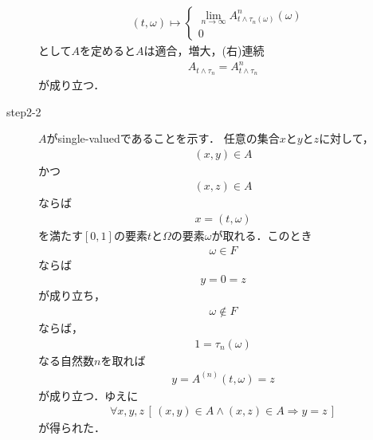 \begin{sketch}
\begin{description}
				
				
				\begin{align}
					(t,\omega) \longmapsto
					\begin{cases}
						\lim_{n \to \infty} A^n_{t \wedge \tau_n(\omega)}(\omega) & \\
						0
					\end{cases}
				\end{align}
				として$A$を定めると$A$は適合，増大，(右)連続
				\begin{align}
					A_{t \wedge \tau_n} = A^n_{t \wedge \tau_n}
				\end{align}
				が成り立つ．
				
			\item[step2-2]
				$A$がsingle-valuedであることを示す．
				任意の集合$x$と$y$と$z$に対して，
				\begin{align}
					(x,y) \in A
				\end{align}
				かつ
				\begin{align}
					(x,z) \in A
				\end{align}
				ならば
				\begin{align}
					x = (t,\omega)
				\end{align}
				を満たす$[0,1]$の要素$t$と$\Omega$の要素$\omega$が取れる．このとき
				\begin{align}
					\omega \in F
				\end{align}
				ならば
				\begin{align}
					y = 0 = z
				\end{align}
				が成り立ち，
				\begin{align}
					\omega \notin F
				\end{align}
				ならば，
				\begin{align}
					1 = \tau_{n}(\omega)
				\end{align}
				なる自然数$n$を取れば
				\begin{align}
					y = A^{(n)}(t,\omega) = z
				\end{align}
				が成り立つ．ゆえに
				\begin{align}
					\forall x,y,z\, \left[\, 
					(x,y) \in A \wedge (x,z) \in A \Longrightarrow y = z\, \right]
				\end{align}
				が得られた．
				

\end{description}
\end{sketch}
